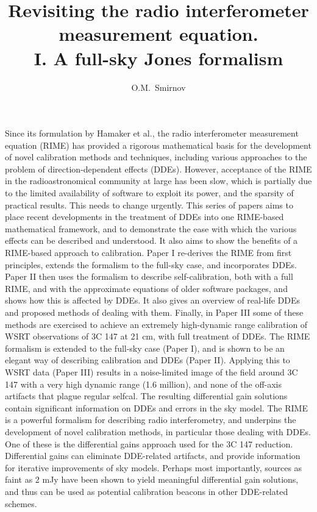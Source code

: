 \documentclass{aa}
\begin{document}
\title{Revisiting the radio interferometer measurement equation.\\I. A full-sky Jones formalism}

\author{O.M.\ Smirnov}


\date{}


\abstract%
{Since its formulation by Hamaker et al., the radio interferometer measurement equation (RIME) 
has provided a rigorous mathematical basis for the development of novel calibration methods and 
techniques, including various approaches to the problem of direction-dependent effects (DDEs). 
However, acceptance of the RIME in the radioastronomical community at large has been slow, which is
partially due to the limited availability of software to exploit its power, and the sparsity of 
practical results. This needs to change urgently.}
{This series of papers aims to place recent developments in the treatment of DDEs into one 
RIME-based mathematical  framework, and to demonstrate the ease with which the various effects 
can be described and understood. It also aims to show the benefits of a RIME-based approach to calibration.
}
{Paper I re-derives the RIME from first principles, extends the formalism to
the full-sky case, and incorporates DDEs. Paper II then uses the formalism to describe self-calibration, both with 
a full RIME, and with the approximate equations of older software packages, and shows how this is affected 
by DDEs. It also gives an overview of real-life DDEs and proposed methods of dealing with them. Finally, in Paper III 
some of these methods are exercised to achieve an extremely high-dynamic range calibration of WSRT observations of 3C 147 at 21 cm, 
with full treatment of DDEs.
}%
{The RIME formalism is extended to the full-sky case (Paper I), and is shown to be an elegant way of describing calibration and DDEs (Paper II).
Applying this to WSRT data (Paper III) results in a noise-limited image of the field around 3C 147 with a very high dynamic range (1.6 million), and 
none of the off-axis artifacts that plague regular selfcal. The resulting differential gain solutions contain significant 
information on DDEs and errors in the sky model. 
}%
{The RIME is a powerful formalism for describing radio interferometry, and underpins the development of novel calibration methods,
in particular those dealing with DDEs. One of these is the differential gains approach used for the 3C 147 reduction. Differential 
gains can eliminate DDE-related artifacts, and provide information for iterative improvements of sky models. 
Perhaps most importantly, sources as faint as 2 mJy have been shown to yield meaningful differential gain solutions, 
and thus can be used as potential calibration beacons in other DDE-related schemes.}
\end{document}
